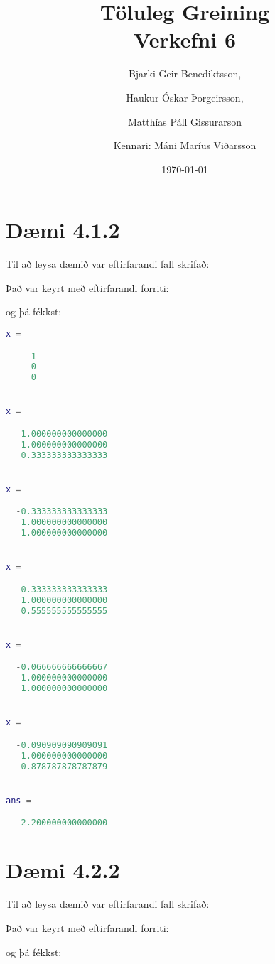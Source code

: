 \documentclass[a4]{article}
\title{Töluleg Greining\\ Verkefni 6}
\date{\today{}}
\author{ 
  Bjarki Geir Benediktsson,\and
  Haukur Óskar Þorgeirsson,\and
  Matthías Páll Gissurarson \and
  Kennari: Máni Maríus Viðarsson
  }
\begin{document}
\maketitle
\section{Dæmi 4.1.2}
Til að leysa dæmið var eftirfarandi fall skrifað:


Það var keyrt með eftirfarandi forriti:


og þá fékkst:

\begin{lstlisting}[language=Matlab]
x =

     1
     0
     0


x =

   1.000000000000000
  -1.000000000000000
   0.333333333333333


x =

  -0.333333333333333
   1.000000000000000
   1.000000000000000


x =

  -0.333333333333333
   1.000000000000000
   0.555555555555555


x =

  -0.066666666666667
   1.000000000000000
   1.000000000000000


x =

  -0.090909090909091
   1.000000000000000
   0.878787878787879


ans =

   2.200000000000000
\end{lstlisting}

\section{Dæmi 4.2.2}

Til að leysa dæmið var eftirfarandi fall skrifað:


Það var keyrt með eftirfarandi forriti:


og þá fékkst:
\end{document}
